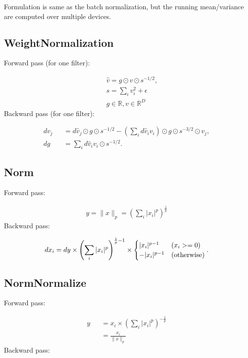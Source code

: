 \documentclass{article}
\begin{document}
Formulation is same as the batch normalization, but the running mean/variance are computed over multiple devices.

\subsection{WeightNormalization}

Forward pass (for one filter):

\begin{eqnarray}
  && \hat{v} = g \odot v \odot s^{-1/2}, \\
  && s = \sum_i v_i^2 + \epsilon \\
  && g \in \mathbb{R}, v \in \mathbb{R}^D
\end{eqnarray}
%
Backward pass (for one filter):

\begin{eqnarray}
  dv_j &&= d\hat{v}_j \odot g \odot s^{-1/2} - \left( \sum_i d\hat{v}_i v_i \right) \odot g \odot s^{-3/2} \odot v_j, \\
  dg &&= \sum_{i} d\hat{v}_i v_i \odot s^{-1/2}.
\end{eqnarray}

\subsection{Norm}

Forward pass:

\begin{eqnarray}
    y = \|x\|_p = \left( \sum_i |x_i|^p \right)^{\frac{1}{p}}
\end{eqnarray}
%
Backward pass:

\begin{eqnarray}
    dx_i = dy \times \left( \sum_i |x_i|^p \right)^{\frac{1}{p} - 1} \times
    \begin{cases}
     |x_i|^{p-1} & (x_i >= 0) \\
     -|x_i|^{p-1} & ({\rm otherwise})
  \end{cases}. 
\end{eqnarray}

\subsection{NormNormalize}

Forward pass:

\begin{eqnarray}
    y &&= x_i \times \left( \sum_i |x_i|^p \right)^{-\frac{1}{p}} \\
      &&= \frac{x_i}{\|x\|_p}
\end{eqnarray}
%
Backward pass:
\end{document}
